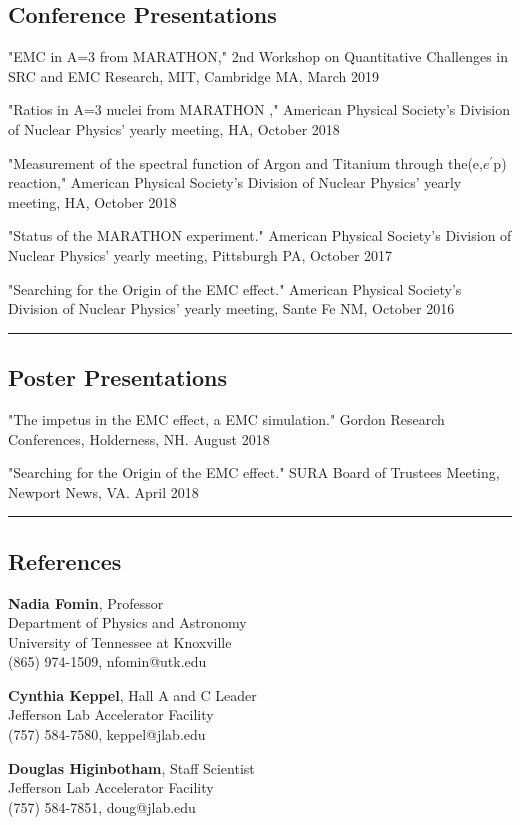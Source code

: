 \documentclass[12pt,letterpaper]{article}
\begin{document}
\subsection*{Conference Presentations}
\begin{itemize*}
	\item "EMC in A=3 from MARATHON," 2nd Workshop on Quantitative Challenges in SRC and EMC Research,  MIT, Cambridge MA,  March 2019
	\item "Ratios in A=3 nuclei from MARATHON ," American Physical Society's Division of Nuclear Physics' yearly meeting, HA, October 2018
	\item "Measurement of the spectral function of Argon and Titanium through the(e,$e^\prime$p) reaction," American Physical Society's Division of Nuclear Physics' yearly meeting, HA, October 2018
	\item "Status of the MARATHON experiment." American Physical Society's Division of Nuclear Physics' yearly meeting, Pittsburgh PA, October 2017
	\item "Searching for the Origin of the EMC effect." American Physical Society's Division of Nuclear Physics' yearly meeting, Sante Fe NM, October 2016
\end{itemize*}

\hrule
\subsection*{Poster Presentations}
\begin{itemize*}
	\item "The impetus in the EMC effect, a EMC simulation." Gordon Research Conferences, Holderness, NH. August 2018 
	\item "Searching for the Origin of the EMC effect." SURA Board of Trustees Meeting, Newport News, VA. April 2018 
\end{itemize*}
\hrule
\subsection*{References}
\begin{multicols}{2}
	{\noindent\bf{Nadia Fomin}}, Professor\\
	Department of Physics and Astronomy\\ 
	University of Tennessee at Knoxville\\
	(865) 974-1509, nfomin@utk.edu\\
	\columnbreak
	
	{\noindent\bf{Cynthia Keppel}}, Hall A and C Leader\\
	Jefferson Lab Accelerator Facility\\
	(757) 584-7580, keppel@jlab.edu\\
\end{multicols}
	{\noindent\bf{Douglas Higinbotham}}, Staff Scientist\\
	Jefferson Lab Accelerator Facility\\
	(757) 584-7851, doug@jlab.edu\\
\end{document}
